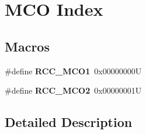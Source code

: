\hypertarget{group___r_c_c___m_c_o___index}{}\section{M\+CO Index}
\label{group___r_c_c___m_c_o___index}
\subsection*{Macros}
\begin{DoxyCompactItemize}
\item 
\mbox{\label{group___r_c_c___m_c_o___index_ga152dd1ae9455e528526c4e23a817937b}} 
\#define {\bfseries R\+C\+C\+\_\+\+M\+C\+O1}~0x00000000U
\item 
\mbox{\label{group___r_c_c___m_c_o___index_ga248f59fc2868f83bea4f2d182edcdf4c}} 
\#define {\bfseries R\+C\+C\+\_\+\+M\+C\+O2}~0x00000001U
\end{DoxyCompactItemize}


\subsection{Detailed Description}
